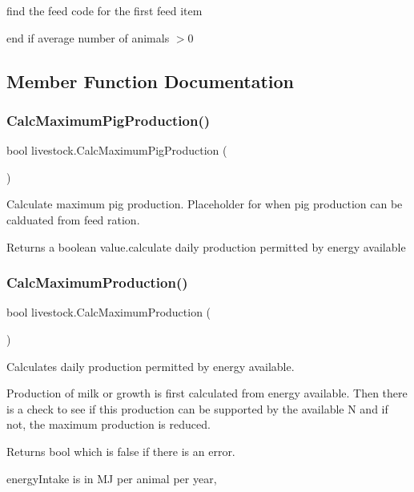 find the feed code for the first feed item

end if average number of animals $>$0 

\subsection{Member Function Documentation}
\mbox{\label{classlivestock_a01c291e9fb7f5a9ca29cbadf7bc1be08}} 
\subsubsection{\texorpdfstring{CalcMaximumPigProduction()}{CalcMaximumPigProduction()}}
{\footnotesize\ttfamily bool livestock.\+Calc\+Maximum\+Pig\+Production (\begin{DoxyParamCaption}{ }\end{DoxyParamCaption})\hspace{0.3cm}{\ttfamily [inline]}}



Calculate maximum pig production. Placeholder for when pig production can be calduated from feed ration. 

\begin{DoxyReturn}{Returns}
a boolean value.\+calculate daily production permitted by energy available 
\end{DoxyReturn}
\mbox{\label{classlivestock_a47d7963fe09dec2dcc05a671433e492a}} 
\subsubsection{\texorpdfstring{CalcMaximumProduction()}{CalcMaximumProduction()}}
{\footnotesize\ttfamily bool livestock.\+Calc\+Maximum\+Production (\begin{DoxyParamCaption}{ }\end{DoxyParamCaption})\hspace{0.3cm}{\ttfamily [inline]}}



Calculates daily production permitted by energy available. 

Production of milk or growth is first calculated from energy available. Then there is a check to see if this production can be supported by the available N and if not, the maximum production is reduced. \begin{DoxyReturn}{Returns}
bool which is false if there is an error. 
\end{DoxyReturn}
energy\+Intake is in MJ per animal per year,

